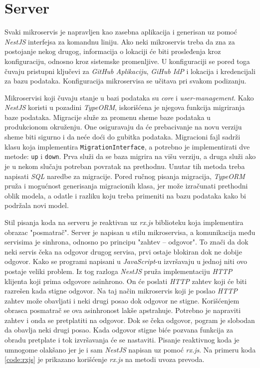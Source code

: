 \section{Server}
Svaki mikroservis je napravljen kao zasebna aplikacija i generisan uz pomoć 
\textit{NestJS} interfejsa za komandnu liniju. Ako neki mikroservis treba 
da zna za postojanje nekog drugog, informacija o lokaciji će biti prosleđenja 
kroz konfiguraciju, odnosno kroz sistemske promenljive. U konfiguraciji 
se pored toga čuvaju pristupni ključevi za \textit{GitHub Aplikaciju}, 
\textit{GiHub IdP} i lokacija i kredencijali za bazu podataka. Konfiguracija 
mikroservisa se učitava pri svakom podizanju.

Mikroservisi koji čuvaju stanje u bazi podataka su \textit{core} i 
\textit{user-management}. Kako \textit{NestJS} koristi u pozadini \textit{TypeORM}, 
iskorišćena je njegova funkcija migriranja baze podataka. Migracije služe 
za promenu sheme baze podataka u produkcionom okruženju. One osiguravaju da 
će prebacivanje na novu verziju sheme biti sigurno i da neće doći do gubitka 
podataka. Migracioni fajl sadrži klasu koja implementira 
\texttt{MigrationInterface}, a potrebno je implementirati dve metode: 
\texttt{up} i \texttt{down}. Prva služi da se baza migrira na višu 
verziju, a druga služi ako je u nekom slučaju potreban povratak na prethodnu. 
Unutar tih metoda treba napisati \textit{SQL} naredbe za migracije. Pored 
ručnog pisanja migracija, \textit{TypeORM} pruža i mogućnost generisanja 
migracionih klasa, jer može izračunati prethodni oblik modela, a odatle i 
razliku koju treba primeniti na bazu podataka kako bi podržala novi model. 

Stil pisanja koda na serveru je reaktivan uz \textit{rx.js} biblioteku koja
implementira obrazac "posmatrač". Server je napisan u stilu mikroservisa,
a komunikacija među servisima je sinhrona, odnosno po principu 
"zahtev -- odgovor". To znači da dok neki servis čeka na odgovor drugog 
servisa, prvi ostaje blokiran dok ne dobije odgovor. Kako se programi napisani 
u \textit{JavaScript}-u izvršavaju u jednoj niti ovo postaje veliki problem. 
Iz tog razloga \textit{NestJS} pruža implementaciju \textit{HTTP} klijenta 
koji prima odgovore asinhrono. On će poslati \textit{HTTP} zahtev koji će biti razrešen kada 
stigne odgovor. Na taj način mikroservis koji je poslao \textit{HTTP} zahtev 
može obavljati i neki drugi posao dok odgovor ne stigne. Korišćenjem obrasca 
posmatrač se ova asinhronost lakše apstrahuje. Potrebno je napraviti zahtev 
i onda se pretplatiti na odgovor. Dok se čeka odgovor, pogram je slobodan da 
obavlja neki drugi posao. Kada odgovor stigne biće pozvana funkcija 
za obradu pretplate i tok izvršavanja će se nastaviti.
Pisanje reaktivnog koda je umnogome olakšano jer je i sam \textit{NestJS} 
napisan uz pomoć \textit{rx.js}. Na primeru koda \ref{code:rxjs} je prikazano
korišćenje \textit{rx.js} na metodi uvoza prevoda.


